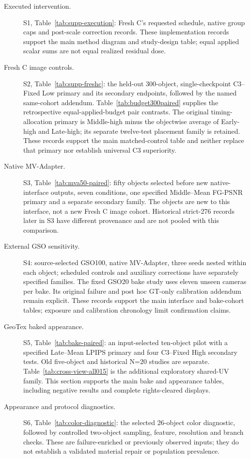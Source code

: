 \documentclass[11pt]{article}
\begin{document}
\begin{description}
\item[Executed intervention.] S1, Table~\ref{tab:supp-execution}: Fresh C's requested schedule, native group caps and post-scale correction records. These implementation records support the main method diagram and study-design table; equal applied scalar sums are not equal realized residual dose.
\item[Fresh C image controls.] S2, Table~\ref{tab:supp-freshc}: the held-out 300-object, single-checkpoint C3--Fixed Low primary and its secondary endpoints, followed by the named same-cohort addendum. Table~\ref{tab:budget300paired} supplies the retrospective equal-applied-budget pair contrasts. The original timing-allocation primary is Middle-high minus the objectwise average of Early-high and Late-high; its separate twelve-test placement family is retained. These records support the main matched-control table and neither replace that primary nor establish universal C3 superiority.
\item[Native MV-Adapter.] S3, Table~\ref{tab:mva50-paired}: fifty objects selected before new native-interface outputs, seven conditions, one specified Middle--Mean FG-PSNR primary and a separate secondary family. The objects are new to this interface, not a new Fresh C image cohort. Historical strict-276 records later in S3 have different provenance and are not pooled with this comparison.
\item[External GSO sensitivity.] S4: source-selected GSO100, native MV-Adapter, three seeds nested within each object; scheduled controls and auxiliary corrections have separately specified families. The fixed GSO20 bake study uses eleven unseen cameras per bake. Its original failure and post hoc GT-only calibration addendum remain explicit. These records support the main interface and bake-cohort tables; exposure and calibration chronology limit confirmation claims.
\item[GeoTex baked appearance.] S5, Table~\ref{tab:bake-paired}: an input-selected ten-object pilot with a specified Late--Mean LPIPS primary and four C3--Fixed High secondary tests. Old five-object and historical N=20 studies are separate. Table~\ref{tab:cross-view-all015} is the additional exploratory shared-UV family. This section supports the main bake and appearance tables, including negative results and complete rights-cleared displays.
\item[Appearance and protocol diagnostics.] S6, Table~\ref{tab:color-diagnostic}: the selected 26-object color diagnostic, followed by controlled two-object sampling, feature, resolution and branch checks. These are failure-enriched or previously observed inputs; they do not establish a validated material repair or population prevalence.

\end{description}
\end{document}
